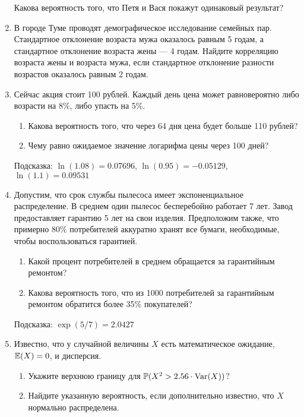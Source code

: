 \begin{enumerate}
Какова вероятность того, что Петя и Вася покажут одинаковый результат?

\item В городе Туме проводят демографическое исследование семейных пар. Стандартное
отклонение возраста мужа оказалось равным 5 годам, а стандартное отклонение возраста
жены — 4 годам. Найдите корреляцию возраста жены и возраста мужа, если стандартное
отклонение разности возрастов оказалось равным 2 годам.

\item Сейчас акция стоит 100 рублей. Каждый день цена может равновероятно либо
возрасти на 8\%, либо упасть на 5\%.
\begin{enumerate}
\item Какова вероятность того, что через 64 дня цена будет больше 110 рублей?
\item Чему равно ожидаемое значение логарифма цены через 100 дней?
\end{enumerate}
Подсказка: $\ln(1.08)=0.07696$, $\ln(0.95)=-0.05129$, $\ln(1.1)=0.09531$

\item Допустим, что срок службы пылесоса имеет экспоненциальное распределение.
В среднем один пылесос бесперебойно работает 7 лет. Завод предоставляет гарантию
5 лет на свои изделия. Предположим также, что примерно 80\% потребителей аккуратно
хранят все бумаги, необходимые, чтобы воспользоваться гарантией.
\begin{enumerate}
\item Какой процент потребителей в среднем обращается за гарантийным ремонтом?
\item Какова вероятность того, что из 1000 потребителей за гарантийным ремонтом
обратится более 35\% покупателей?
\end{enumerate}
Подсказка: $\exp(5/7)=2.0427$

\item Известно, что у случайной величины $X$ есть математическое ожидание, $\operatorname{\mathbb{E}}(X)=0$,
и дисперсия.
\begin{enumerate}
\item Укажите верхнюю границу для $\operatorname{\mathbb{P}}(X^{2}>2.56\cdot \operatorname{Var}(X))$? %
\item Найдите указанную вероятность, если дополнительно известно, что
$X$ нормально распределена. %
\end{enumerate}
\end{enumerate}

